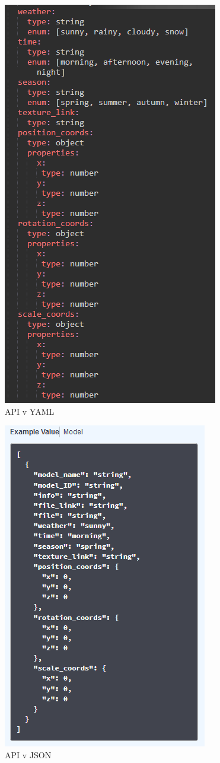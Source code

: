 \documentclass[thesis=B,czech]{FITthesis}[2012/06/26]
\begin{document}
	\begin{figure}
  		\includegraphics{api.png}
  		\caption{API v YAML}
  		\label{fig:yamlAPI}
	\end{figure}
	
	
	\begin{figure}
  		\includegraphics{apiJSON.png}
  		\caption{API v JSON}
  		\label{fig:jsonAPI}
	\end{figure}
 	
\end{document}
